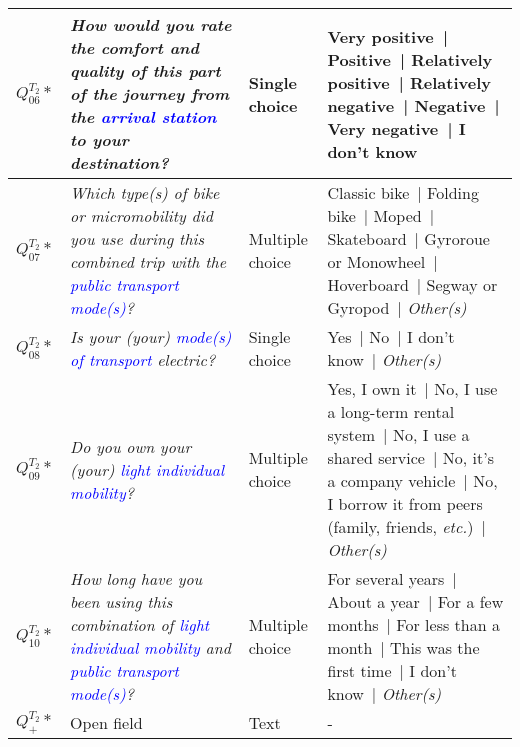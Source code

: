 \begin{table}[h!]
{\begin{tabular}{p{}p{}p{}p{}}
\hline
    \small{\textbf{\(Q_{06}^{T_{2}}*\)}} & \small{\textsl{How would you rate the comfort and quality of this part of the journey from the \textcolor{blue}{arrival station} to your destination?}} & \small{Single choice} & \small{Very positive~| Positive~| Relatively positive~| Relatively negative~| Negative~| Very negative~| I don't know}\\
\hline
    \small{\textbf{\(Q_{07}^{T_{2}}*\)}} & \small{\textsl{Which type(s) of bike or micromobility did you use during this combined trip with the \textcolor{blue}{public transport mode(s)}?}} & \small{Multiple choice} & \small{Classic bike~| Folding bike~| Moped~| Skateboard~| Gyroroue or Monowheel~| Hoverboard~| Segway or Gyropod~| \textsl{Other(s)}}\\
\hline
    \small{\textbf{\(Q_{08}^{T_{2}}*\)}} & \small{\textsl{Is your (your) \textcolor{blue}{mode(s) of transport} electric?}} & \small{Single choice} & \small{Yes~| No~| I don't know~| \textsl{Other(s)}}\\
\hline
    \small{\textbf{\(Q_{09}^{T_{2}}*\)}} & \small{\textsl{Do you own your (your) \textcolor{blue}{light individual mobility}?}} & \small{Multiple choice} & \small{Yes, I own it~| No, I use a long-term rental system~| No, I use a shared service~| No, it’s a company vehicle~| No, I borrow it from peers (family, friends, \textsl{etc.})~| \textsl{Other(s)}}\\
\hline
    \small{\textbf{\(Q_{10}^{T_{2}}*\)}} & \small{\textsl{How long have you been using this combination of \textcolor{blue}{light individual mobility} and \textcolor{blue}{public transport mode(s)}?}} & \small{Multiple choice} & \small{For several years~| About a year~| For a few months~| For less than a month~| This was the first time~| I don't know~| \textsl{Other(s)}}\\
\hline
    \small{\textbf{\(Q_{+}^{T_{2}}*\)}} & \small{Open field} & \small{Text} & \small{-}\\
      \hline
    \end{tabular}}
    \caption*{}
    \vspace{5pt}
        \end{table}

